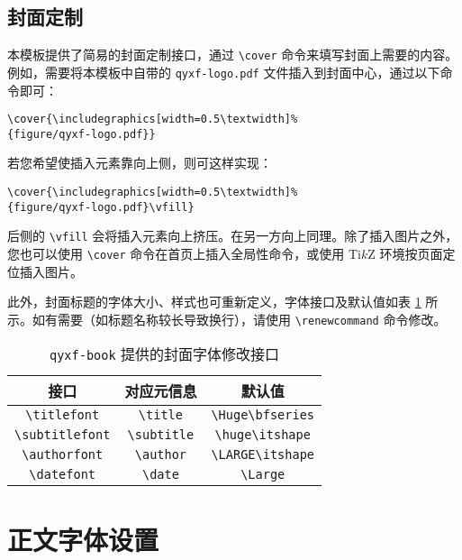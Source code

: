 \documentclass[
  10pt,
  twoside,
  openany,
  b5paper, %
  colorscheme = basic, %
]{qyxf-book}
\renewcommand{\titlefont}{\Huge\bfseries}
\renewcommand{\subtitlefont}{\LARGE\itshape}
\begin{document}
\subsection{封面定制}

本模板提供了简易的封面定制接口，通过 \verb|\cover| 命令来填写封面上需要的内容。例如，需要将本模板中自带的 \verb|qyxf-logo.pdf| 文件插入到封面中心，通过以下命令即可：

\begin{tcolorbox}
\begin{verbatim}
\cover{\includegraphics[width=0.5\textwidth]%
{figure/qyxf-logo.pdf}}
\end{verbatim}
\end{tcolorbox}
若您希望使插入元素靠向上侧，则可这样实现：
\begin{tcolorbox}
\begin{verbatim}
\cover{\includegraphics[width=0.5\textwidth]%
{figure/qyxf-logo.pdf}\vfill}
\end{verbatim}
\end{tcolorbox}
后侧的 \verb|\vfill| 会将插入元素向上挤压。在另一方向上同理。除了插入图片之外，您也可以使用 \verb|\cover| 命令在首页上插入全局性命令，或使用 Ti$k$Z 环境按页面定位插入图片。

此外，封面标题的字体大小、样式也可重新定义，字体接口及默认值如表 \ref{tab:preface-font} 所示。如有需要（如标题名称较长导致换行），请使用 \verb|\renewcommand| 命令修改。

\begin{table}[htbp]
  \centering
  \caption{\texttt{qyxf-book} 提供的封面字体修改接口}
  \label{tab:preface-font}
  \begin{tabular}{ccc}
    \toprule
    接口                    & 对应元信息              & 默认值                  \\
    \midrule
    \verb|\titlefont| & \verb|\title| & \verb|\Huge\bfseries| \\
    \verb|\subtitlefont| & \verb|\subtitle| & \verb|\huge\itshape| \\
    \verb|\authorfont| & \verb|\author| & \verb|\LARGE\itshape| \\
    \verb|\datefont| & \verb|\date| & \verb|\Large| \\
    \bottomrule
  \end{tabular}
\end{table}

\section{正文字体设置}
\end{document}
